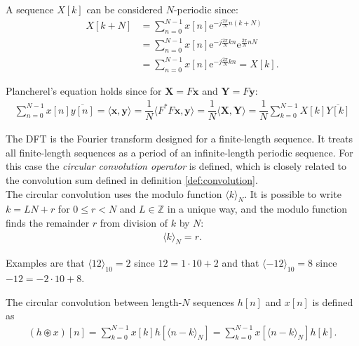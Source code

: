 A sequence $X[k]$ can be considered $N$-periodic since:
\begin{align*}
	X[k+N]
	&= \sum_{n=0}^{N-1} x[n] \text{e}^{-j \frac{2 \pi}{N}  n (k		+N)} \\
	&= \sum_{n=0}^{N-1} x[n] \text{e}^{-j \frac{2 \pi}{N}kn}		\text{e}^{\frac{2 \pi}{N} nN} \\
	&= \sum_{n=0}^{N-1} x[n] \text{e}^{-j \frac{2 \pi}{N} k n} 		= X[k].
\end{align*}

Plancherel's equation holds since for $\textbf{X} = F\textbf{x}$ and $\textbf{Y} = F\textbf{y}$:
\begin{align*}
\sum_{n=0}^{N-1} x[n] \overline{y[n]} = \langle \textbf{x},\textbf{y} \rangle = \dfrac{1}{N} \langle F^*F\textbf{x},\textbf{y} \rangle = \dfrac{1}{N} \langle \textbf{X},\textbf{Y} \rangle = \dfrac{1}{N} \sum_{k=0}^{N-1} X[k] \overline{Y[k]}
\end{align*}

The DFT is the Fourier transform designed for a finite-length sequence.
It treats all finite-length sequences as a period of an infinite-length periodic sequence.
For this case the \textit{circular convolution operator} is defined, which is closely related to the convolution sum defined in definition \ref{def:convolution}. \\
The circular convolution uses the modulo function $\langle k\rangle_N$. It is possible to write $k = LN+r$ for $0 \leq r < N$ and $L \in \mathbb{Z}$ in a unique way, and the modulo function finds the remainder $r$ from division of $k$ by $N$:
\begin{align*}
\langle k \rangle_N = r.
\end{align*}

Examples are that $\langle 12 \rangle_{10} = 2$ since $12 = 1 \cdot 10 + 2$ and that $\langle -12 \rangle_{10} = 8$ since $-12 = -2 \cdot 10 + 8$.

\begin{definition}
 	The circular convolution between length-$N$ sequences $h[n]$ 		and $x[n]$ is defined as
	\begin{align*}
	(h \circledast x)[n] = \sum_{k = 0}^{N-1} x[k] 		h[\langle n-k\rangle_N] =\sum_{k = 0}^{N-1} x[\langle n-k		\rangle_N] h[k].
	\end{align*}
\end{definition}

